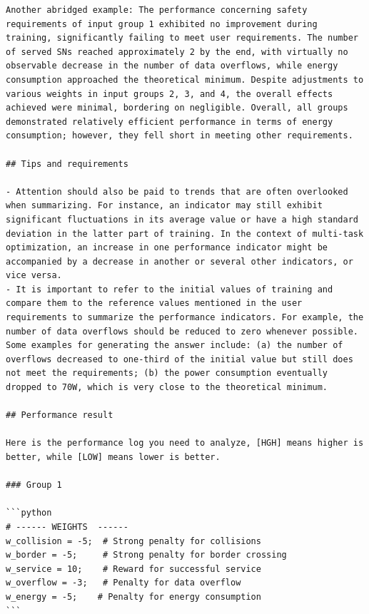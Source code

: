 \documentclass{article}
\begin{document}
\begin{verbatim}
Another abridged example: The performance concerning safety requirements of input group 1 exhibited no improvement during training, significantly failing to meet user requirements. The number of served SNs reached approximately 2 by the end, with virtually no observable decrease in the number of data overflows, while energy consumption approached the theoretical minimum. Despite adjustments to various weights in input groups 2, 3, and 4, the overall effects achieved were minimal, bordering on negligible. Overall, all groups demonstrated relatively efficient performance in terms of energy consumption; however, they fell short in meeting other requirements.

## Tips and requirements

- Attention should also be paid to trends that are often overlooked when summarizing. For instance, an indicator may still exhibit significant fluctuations in its average value or have a high standard deviation in the latter part of training. In the context of multi-task optimization, an increase in one performance indicator might be accompanied by a decrease in another or several other indicators, or vice versa.
- It is important to refer to the initial values of training and compare them to the reference values mentioned in the user requirements to summarize the performance indicators. For example, the number of data overflows should be reduced to zero whenever possible. Some examples for generating the answer include: (a) the number of overflows decreased to one-third of the initial value but still does not meet the requirements; (b) the power consumption eventually dropped to 70W, which is very close to the theoretical minimum.

## Performance result

Here is the performance log you need to analyze, [HGH] means higher is better, while [LOW] means lower is better.

### Group 1

```python
# ------ WEIGHTS  ------
w_collision = -5;  # Strong penalty for collisions
w_border = -5;     # Strong penalty for border crossing
w_service = 10;    # Reward for successful service
w_overflow = -3;   # Penalty for data overflow
w_energy = -5;    # Penalty for energy consumption
```


\end{verbatim}
\end{document}
